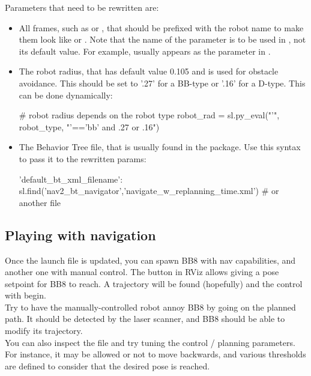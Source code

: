 \documentclass{ecnreport}
\begin{document}
Parameters that need to be rewritten are:
\begin{itemize}
 \item All frames, such as  or , that should be prefixed with the robot name to make them look like  or . Note that the name of the parameter is to be used in , not its default value. For example,  usually appears as the  parameter in .
 \item The robot radius, that has default value 0.105 and is used for obstacle avoidance. This should be set to '.27' for a BB-type or '.16' for a D-type. This can be done dynamically:
\begin{pythoncodelarge}
# robot radius depends on the robot type
robot_rad = sl.py_eval("'", robot_type, "'=='bb' and .27 or .16")
\end{pythoncodelarge}
\item The Behavior Tree file, that is usually found in the  package. Use this syntax to pass it to the rewritten params:
\begin{pythoncode}
 'default_bt_xml_filename': sl.find('nav2_bt_navigator','navigate_w_replanning_time.xml')   # or another file
\end{pythoncode}
\end{itemize}

\subsection{Playing with navigation}

Once the launch file is updated, you can spawn BB8 with nav capabilities, and another one with manual control. The  button in RViz allows giving a pose setpoint for BB8 to reach. A trajectory will be found (hopefully) and the control with begin.\\

Try to have the manually-controlled robot annoy BB8 by going on the planned path. It should be detected by the laser scanner, and BB8 should be able to modify its trajectory.\\

You can also inspect the  file and try tuning the control / planning parameters. For instance, it may be allowed or not to move backwards, and various thresholds are defined to consider that the desired pose is reached.
\end{document}
